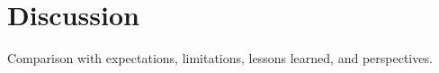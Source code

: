 \section*{Discussion}

Comparison with expectations, limitations, lessons learned, and perspectives.
